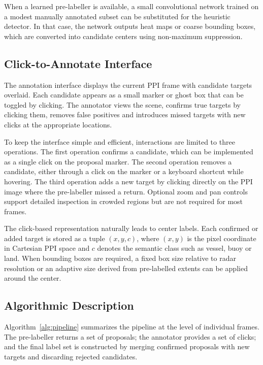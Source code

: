 \documentclass[twocolumn, 10pt]{article}
\begin{document}
When a learned pre-labeller is available, a small convolutional network trained on a modest manually annotated subset can be substituted for the heuristic detector. In that case, the network outputs heat maps or coarse bounding boxes, which are converted into candidate centers using non-maximum suppression.

\subsection{Click-to-Annotate Interface}

The annotation interface displays the current PPI frame with candidate targets overlaid. Each candidate appears as a small marker or ghost box that can be toggled by clicking. The annotator views the scene, confirms true targets by clicking them, removes false positives and introduces missed targets with new clicks at the appropriate locations.

To keep the interface simple and efficient, interactions are limited to three operations. The first operation confirms a candidate, which can be implemented as a single click on the proposal marker. The second operation removes a candidate, either through a click on the marker or a keyboard shortcut while hovering. The third operation adds a new target by clicking directly on the PPI image where the pre-labeller missed a return. Optional zoom and pan controls support detailed inspection in crowded regions but are not required for most frames.

The click-based representation naturally leads to center labels. Each confirmed or added target is stored as a tuple $(x,y,c)$, where $(x,y)$ is the pixel coordinate in Cartesian PPI space and $c$ denotes the semantic class such as vessel, buoy or land. When bounding boxes are required, a fixed box size relative to radar resolution or an adaptive size derived from pre-labelled extents can be applied around the center.

\subsection{Algorithmic Description}

Algorithm~\ref{alg:pipeline} summarizes the pipeline at the level of individual frames. The pre-labeller returns a set of proposals; the annotator provides a set of clicks; and the final label set is constructed by merging confirmed proposals with new targets and discarding rejected candidates.
\end{document}
